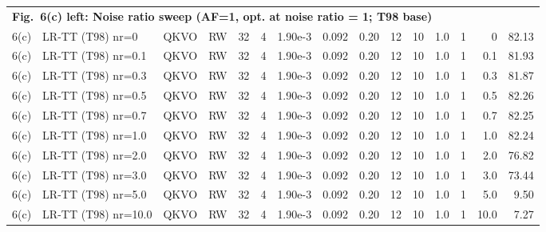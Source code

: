 \documentclass[AMA,LATO1COL]{WileyNJDv5}
\begin{document}
{\begin{longtable}{@{}l l l l r r r r r r r r r r r@{}}
\multicolumn{15}{l}{\cellcolor{HeadGray}\textbf{Fig.~6(c) left: Noise ratio sweep (AF=1, opt. at noise ratio = 1; T98 base)}} \\
6(c) & LR-TT (T98) nr=0 & QKVO & RW & 32 & 4 & 1.90e-3 & 0.092 & 0.20 & 12 & 10 & 1.0 & 1 & 0 & 82.13 \\
6(c) & LR-TT (T98) nr=0.1 & QKVO & RW & 32 & 4 & 1.90e-3 & 0.092 & 0.20 & 12 & 10 & 1.0 & 1 & 0.1 & 81.93 \\
6(c) & LR-TT (T98) nr=0.3 & QKVO & RW & 32 & 4 & 1.90e-3 & 0.092 & 0.20 & 12 & 10 & 1.0 & 1 & 0.3 & 81.87 \\
6(c) & LR-TT (T98) nr=0.5 & QKVO & RW & 32 & 4 & 1.90e-3 & 0.092 & 0.20 & 12 & 10 & 1.0 & 1 & 0.5 & 82.26 \\
6(c) & LR-TT (T98) nr=0.7 & QKVO & RW & 32 & 4 & 1.90e-3 & 0.092 & 0.20 & 12 & 10 & 1.0 & 1 & 0.7 & 82.25 \\
6(c) & LR-TT (T98) nr=1.0 & QKVO & RW & 32 & 4 & 1.90e-3 & 0.092 & 0.20 & 12 & 10 & 1.0 & 1 & 1.0 & 82.24 \\
6(c) & LR-TT (T98) nr=2.0 & QKVO & RW & 32 & 4 & 1.90e-3 & 0.092 & 0.20 & 12 & 10 & 1.0 & 1 & 2.0 & 76.82 \\
6(c) & LR-TT (T98) nr=3.0 & QKVO & RW & 32 & 4 & 1.90e-3 & 0.092 & 0.20 & 12 & 10 & 1.0 & 1 & 3.0 & 73.44 \\
6(c) & LR-TT (T98) nr=5.0 & QKVO & RW & 32 & 4 & 1.90e-3 & 0.092 & 0.20 & 12 & 10 & 1.0 & 1 & 5.0 & 9.50 \\
6(c) & LR-TT (T98) nr=10.0 & QKVO & RW & 32 & 4 & 1.90e-3 & 0.092 & 0.20 & 12 & 10 & 1.0 & 1 & 10.0 & 7.27 \\
\midrule


\end{longtable}}
\end{document}
